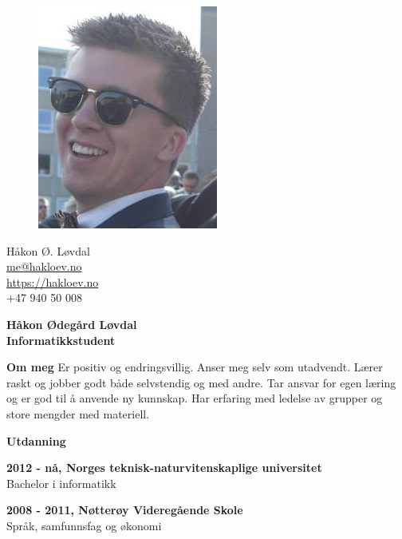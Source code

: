 \documentclass[a4paper,12pt,final]{memoir}
\newcommand{\Sep}{\vspace{1.5em}}
\newcommand{\SmallSep}{\vspace{0.5em}}
\newenvironment{Ommeg}
	{\ignorespaces\textbf{\color{RoyalBlue} Om meg}}
	{\Sep\ignorespacesafterend}
\newcommand{\CVSection}[1]
	{\Large\textbf{#1}\par
	\SmallSep\normalsize\normalfont}
\newcommand{\CVItem}[1]
	{\textbf{\color{RoyalBlue} #1}}
\begin{document}
\begin{figure}
	\hfill
	\includegraphics[width=0.6\columnwidth]{photo.jpg}
	\vspace{-7cm}
\end{figure}

\begin{flushright}\small
	Håkon Ø. Løvdal \\
	\url{me@hakloev.no}  \\
	\url{https://hakloev.no} \\
	+47 940 50 008
\end{flushright}\normalsize
\framebreak


\Huge\bfseries {\color{RoyalBlue} Håkon Ødegård Løvdal} \\
\Large\bfseries  Informatikkstudent \\

\normalsize\normalfont

\begin{Ommeg}
Er positiv og endringsvillig. Anser meg selv som utadvendt. Lærer raskt og jobber godt både selvstendig og med andre. Tar ansvar for egen læring og er god til å anvende ny kunnskap. Har erfaring med ledelse av grupper og store mengder med materiell. 
\end{Ommeg}

\CVSection{Utdanning}
\CVItem{2012 - nå, Norges teknisk-naturvitenskaplige universitet}\\
Bachelor i informatikk
\SmallSep

\CVItem{2008 - 2011, Nøtterøy Videregående Skole}\\
Språk, samfunnsfag og økonomi
\Sep
\end{document}
